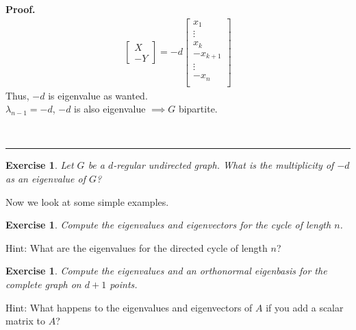 \documentclass[12pt]{article}
\newtheorem{exercise}[theorem]{Exercise}
\newenvironment{proof}[1][Proof]{\textbf{#1.} }{\ \rule{0.5em}{0.5em}}
\begin{document}
\begin{proof}
\begin{align}
\begin{bmatrix}
            X\\
            -Y
        \end{bmatrix}
        = -d
        \begin{bmatrix}
            x_1\\
            \vdots\\
            x_k\\
            -x_{k+1}\\
            \vdots\\
            -x_n\\
        \end{bmatrix}
    \end{align}
    Thus, $-d$ is eigenvalue as wanted.\\
    $\lambda_{n-1} = -d$,
    $-d$ is also eigenvalue $\implies G$ bipartite.
    
\end{proof}












\begin{exercise}
Let $G$ be a $d$-regular undirected graph. What is the multiplicity of $-d$
as an eigenvalue of $G$?
\end{exercise}

Now we look at some simple examples.

\begin{exercise}
Compute the eigenvalues and eigenvectors for the cycle of length $n$.
\end{exercise}

Hint: What are the eigenvalues for the directed cycle of length $n$?

\begin{exercise}
Compute the eigenvalues and an orthonormal eigenbasis for the complete graph
on $d+1$ points.
\end{exercise}

Hint: What happens to the eigenvalues and eigenvectors of $A$ if you add a
scalar matrix to $A$?
\end{document}
